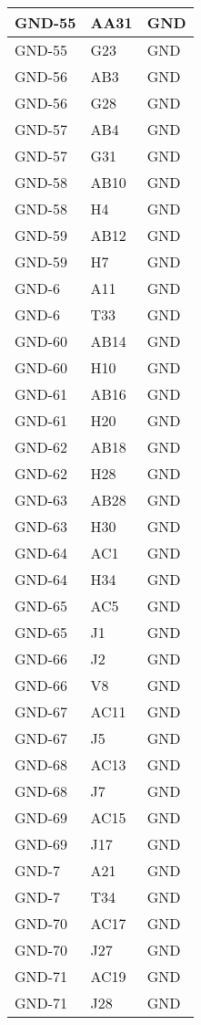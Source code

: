 \begin{footnotesize}
\begin{longtable}{|p{7cm}|p{1cm}|p{5cm}|}
GND-55	&	AA31	&	GND	\\ \hline
GND-55	&	G23	&	GND	\\ \hline
GND-56	&	AB3	&	GND	\\ \hline
GND-56	&	G28	&	GND	\\ \hline
GND-57	&	AB4	&	GND	\\ \hline
GND-57	&	G31	&	GND	\\ \hline
GND-58	&	AB10	&	GND	\\ \hline
GND-58	&	H4	&	GND	\\ \hline
GND-59	&	AB12	&	GND	\\ \hline
GND-59	&	H7	&	GND	\\ \hline
GND-6	&	A11	&	GND	\\ \hline
GND-6	&	T33	&	GND	\\ \hline
GND-60	&	AB14	&	GND	\\ \hline
GND-60	&	H10	&	GND	\\ \hline
GND-61	&	AB16	&	GND	\\ \hline
GND-61	&	H20	&	GND	\\ \hline
GND-62	&	AB18	&	GND	\\ \hline
GND-62	&	H28	&	GND	\\ \hline
GND-63	&	AB28	&	GND	\\ \hline
GND-63	&	H30	&	GND	\\ \hline
GND-64	&	AC1	&	GND	\\ \hline
GND-64	&	H34	&	GND	\\ \hline
GND-65	&	AC5	&	GND	\\ \hline
GND-65	&	J1	&	GND	\\ \hline
GND-66	&	J2	&	GND	\\ \hline
GND-66	&	V8	&	GND	\\ \hline
GND-67	&	AC11	&	GND	\\ \hline
GND-67	&	J5	&	GND	\\ \hline
GND-68	&	AC13	&	GND	\\ \hline
GND-68	&	J7	&	GND	\\ \hline
GND-69	&	AC15	&	GND	\\ \hline
GND-69	&	J17	&	GND	\\ \hline
GND-7	&	A21	&	GND	\\ \hline
GND-7	&	T34	&	GND	\\ \hline
GND-70	&	AC17	&	GND	\\ \hline
GND-70	&	J27	&	GND	\\ \hline
GND-71	&	AC19	&	GND	\\ \hline
GND-71	&	J28	&	GND	\\ \hline

\end{longtable}
\end{footnotesize}
